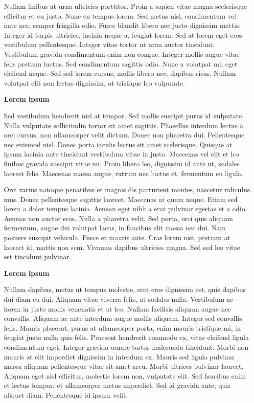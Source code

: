 \documentclass[
]{book}
\begin{document}
Nullam finibus at urna ultricies porttitor. Proin a sapien vitae magna scelerisque efficitur et eu justo. Nunc eu tempus lorem. Sed metus nisl, condimentum vel ante nec, semper fringilla odio. Fusce blandit libero nec justo dignissim mattis. Integer id turpis ultricies, lacinia neque a, feugiat lorem. Sed at lorem eget eros vestibulum pellentesque. Integer vitae tortor ut urna auctor tincidunt. Vestibulum gravida condimentum enim non congue. Integer mollis augue vitae felis pretium luctus. Sed condimentum sagittis odio. Nunc a volutpat mi, eget eleifend neque. Sed sed lorem cursus, mollis libero nec, dapibus risus. Nullam volutpat elit non lectus dignissim, at tristique leo vulputate.

\textbf{Lorem ipsum}

Sed vestibulum hendrerit nisl at tempor. Sed mollis suscipit purus id vulputate. Nulla vulputate sollicitudin tortor sit amet sagittis. Phasellus interdum lectus a orci cursus, non ullamcorper velit dictum. Donec non pharetra dui. Pellentesque nec euismod nisl. Donec porta iaculis lectus sit amet scelerisque. Quisque at ipsum lacinia ante tincidunt vestibulum vitae in justo. Maecenas vel elit et leo finibus gravida suscipit vitae mi. Proin libero leo, dignissim id ante ut, sodales laoreet felis. Maecenas massa augue, rutrum nec luctus et, fermentum eu ligula.

Orci varius natoque penatibus et magnis dis parturient montes, nascetur ridiculus mus. Donec pellentesque sagittis laoreet. Maecenas at quam neque. Etiam sed lorem a dolor tempus lacinia. Aenean eget nibh a erat pulvinar egestas et a odio. Aenean non auctor eros. Nulla a pharetra velit. Sed porta, orci quis aliquam fermentum, augue dui volutpat lacus, in faucibus elit massa nec dui. Nam posuere suscipit vehicula. Fusce et mauris ante. Cras lorem nisi, pretium at laoreet id, mattis non sem. Vivamus dapibus ultricies magna. Sed sed leo vitae est tincidunt pulvinar.

\textbf{Lorem ipsum}

Nullam dapibus, metus ut tempus molestie, erat eros dignissim est, quis dapibus dui diam eu dui. Aliquam vitae viverra felis, ut sodales nulla. Vestibulum ac lorem in justo mollis venenatis et ut leo. Nullam facilisis aliquam augue nec convallis. Aliquam ac ante interdum augue mollis aliquam. Integer sed convallis felis. Mauris placerat, purus at ullamcorper porta, enim mauris tristique mi, in feugiat justo nulla quis felis. Praesent hendrerit commodo ex, vitae eleifend ligula condimentum eget. Integer gravida ornare tortor malesuada tincidunt. Morbi non mauris at elit imperdiet dignissim in interdum ex. Mauris sed ligula pulvinar massa aliquam pellentesque vitae sit amet arcu. Morbi ultrices pulvinar laoreet. Aliquam eget nisl efficitur, molestie lorem non, vulputate elit. Sed faucibus enim et lectus tempor, et ullamcorper metus imperdiet. Sed id gravida ante, quis aliquet diam. Pellentesque id ipsum velit.
\end{document}
